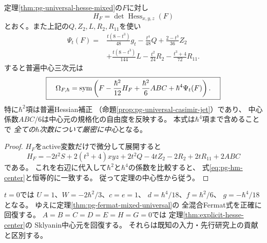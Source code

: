 \begin{corollary}[Hessianによるコンパクトな普遍式]
\label{cor:pg-hesse-hessian-form}
定理\ref{thm:pg-universal-hesse-mixed}の$F$に対し
\begin{equation}
 H_F=\det\operatorname{Hess}_{x,y,z}(F)
\end{equation}
とおく。また上記の$Q,Z_2,L,R_2,R_{11}$を使い
\begin{equation}
\begin{aligned}
 \Psi_t(F)={}&
 \frac{t(8-t^3)}{48}g_t
 -\frac{t^4}{48}Q
 +\frac{2-t^3}{36}Z_2\\
 &+\frac{t(8-t^3)}{144}L
 -\frac{t^2}{24}R_2
 -\frac{t^3+4}{72}R_{11}.
\end{aligned}
\end{equation}
すると普遍中心三次元は
\begin{equation}
 \boxed{\quad
 \Omega_{F,\hbar}
 =\operatorname{sym}\left(
 F-\frac{\hbar^2}{12}H_F
 +\frac{\hbar^2}{6}ABC
 +\hbar^4\Psi_t(F)
 \right).
 \quad}
 \label{eq:pg-hesse-hessian-closed}
\end{equation}
特に$\hbar^2$項は普遍Hessian補正
（命題\ref{prop:pg-universal-casimir-jet}）であり、
中心係数$ABC/6$は中心元の規格化の自由度を反映する。
本式は$\hbar^4$項まで含めることで
\emph{全ての$\hbar$次数について厳密に中心}となる。
\end{corollary}
\begin{proof}
$H_F$をactive変数だけで微分して展開すると
\begin{equation}
 H_F=-2t^2S+2(t^3+4)xyz+
 2t^2Q-4tZ_2-2R_2+2tR_{11}+2ABC
\end{equation}
である。
これを右辺に代入して$\hbar^2$と$\hbar^4$の係数を比較すると、
式\eqref{eq:pg-hm-center}と恒等的に一致する。
従って定理の中心性から従う。
\end{proof}

\begin{remark}[既存の中心元との整合性]
$t=0$では
$U=1$、$W=-2\hbar^2/3$、$c=e=1$、
$d=\hbar^4/18$、$f=\hbar^2/6$、
$g=-\hbar^4/18$となる。
ゆえに定理\ref{thm:pg-fermat-mixed-universal}の
全混合Fermat式を正確に回復する。
$A=B=C=D=E=H=G=0$では
定理\ref{thm:explicit-hesse-center}の
Sklyanin中心元を回復する。
それらは既知の入力・先行研究上の貢献と区別する。
\end{remark}

